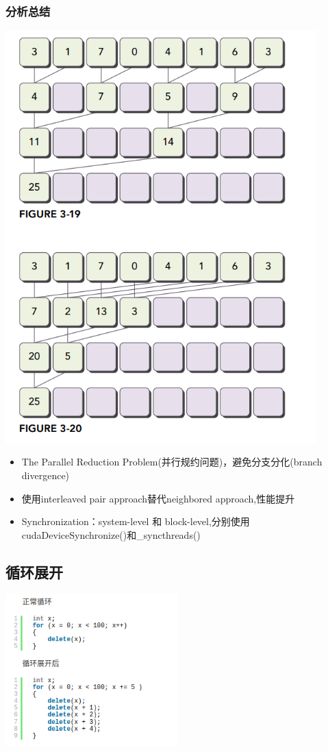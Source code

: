 \subsubsection{分析总结}
\noindent
\includegraphics[width=0.9\textwidth]{assets/interleave.png}
\begin{itemize}
	\item The Parallel Reduction Problem(并行规约问题)，避免分支分化(branch divergence)
	\item 使用interleaved pair approach替代neighbored approach,性能提升
	\item Synchronization：system-level 和 block-level,分别使用cudaDeviceSynchronize()和\_syncthreads()
\end{itemize}


\subsection{循环展开}
\includegraphics[width=0.5\textwidth]{assets/unroll.png}
